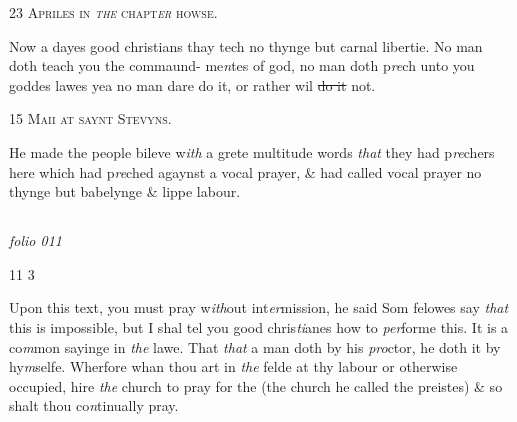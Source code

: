 \documentclass[12pt, a4paper]{book}
\begin{document}
               
                  
				\begin{center}  {\scshape 
                     23 Apriles in \textit{the} chapt\textit{er} howse.}  \end{center}
			


				\marginpar[\vspace{0.5cm}{\textcolor{Gray}{sclanderous n}}]{}
			
		\ifthenelse{\isodd{\thepage}}
		{\reversemarginpar}
		{\normalmarginpar}
		 Now a dayes good christians thay tech no thynge but
 carnal libertie. No man doth teach you the commaund-
 me\textit{n}tes of god, no man doth p\textit{re}ch unto you goddes lawes
 yea no man dare do it, or rather wil \sout{do it} not.
 

               
                  
				\begin{center}  {\scshape 
                     15 Maii at saynt Stevyns.}  \end{center}
			

 
				\marginpar[\vspace{0.5cm}{\textcolor{Gray}{sclanderous}}]{}
			
		\ifthenelse{\isodd{\thepage}}
		{\reversemarginpar}
		{\normalmarginpar}
		He made the people bileve w\textit{ith} a grete multitude words
 \textit{that} they had p\textit{re}chers here which had p\textit{re}ched agaynst a
 vocal prayer, \& had called vocal prayer no thynge but
 babelynge \& lippe labour.
 



\dotfill
					  \subsection*{}

\textit{folio 011}


\begin{flushright}{\color{Mahogany}11} 3\end{flushright}

				\marginpar[\vspace{0.5cm}{\textcolor{Gray}{n}}]{}
			
		\ifthenelse{\isodd{\thepage}}
		{\reversemarginpar}
		{\normalmarginpar}
		 Upon this text, you must pray w\textit{ith}out int\textit{er}mission, he said
 Som felowes say \textit{that} this is impossible, but I shal tel you
 good chris\textit{ti}anes how to \textit{per}forme this. It is a co\textit{m}mon sayinge
 in \textit{the} lawe. That \textit{that} a man doth by his \textit{pro}ctor, he doth
 it by hy\textit{m}selfe. Wherfore whan thou art in \textit{the} felde at
 thy labour or otherwise occupied, hire \textit{the} church to
 pray for the (the church he called the preistes) \& so shalt
 thou co\textit{n}tinually pray.
	
\end{document}
